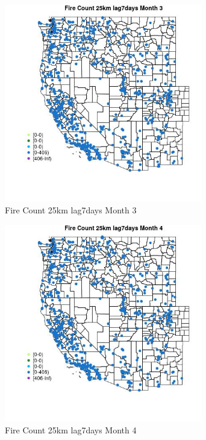 \begin{figure} 
\centering  
\includegraphics[width=0.77\textwidth]{Code_Outputs/Report_ML_input_PM25_Step4_part_f_de_duplicated_aves_prioritize_24hr_obswNAs_MapObsMo3Fire_Count_25km_lag7days.jpg} 
\caption{\label{fig:Report_ML_input_PM25_Step4_part_f_de_duplicated_aves_prioritize_24hr_obswNAsMapObsMo3Fire_Count_25km_lag7days}Fire Count 25km lag7days Month 3} 
\end{figure} 
 

\begin{figure} 
\centering  
\includegraphics[width=0.77\textwidth]{Code_Outputs/Report_ML_input_PM25_Step4_part_f_de_duplicated_aves_prioritize_24hr_obswNAs_MapObsMo4Fire_Count_25km_lag7days.jpg} 
\caption{\label{fig:Report_ML_input_PM25_Step4_part_f_de_duplicated_aves_prioritize_24hr_obswNAsMapObsMo4Fire_Count_25km_lag7days}Fire Count 25km lag7days Month 4} 
\end{figure} 
 

